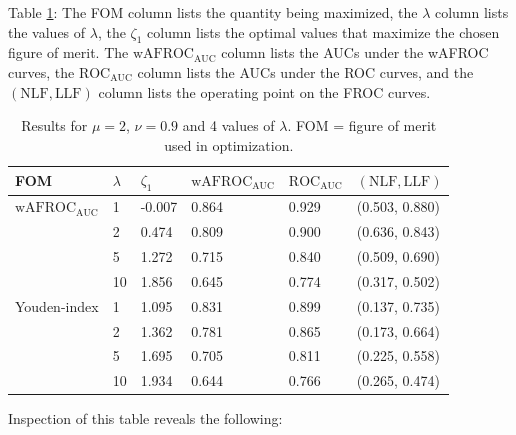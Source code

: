 \documentclass[
]{book}
\begin{document}
Table \ref{tab:optim-op-point-table-vary-lambda}: The FOM column lists the quantity being maximized, the \(\lambda\) column lists the values of \(\lambda\), the \(\zeta_1\) column lists the optimal values that maximize the chosen figure of merit. The \(\text{wAFROC}_\text{AUC}\) column lists the AUCs under the wAFROC curves, the \(\text{ROC}_\text{AUC}\) column lists the AUCs under the ROC curves, and the \(\left( \text{NLF}, \text{LLF}\right)\) column lists the operating point on the FROC curves.

\begin{table}

\caption{\label{tab:optim-op-point-table-vary-lambda}Results for $\mu = 2$, $\nu = 0.9$ and 4 values of $\lambda$. FOM = figure of merit used in optimization.}
\centering
\fontsize{10}{12}\selectfont
\begin{tabular}[t]{llllll}
\toprule
FOM & $\lambda$ & $\zeta_1$ & $\text{wAFROC}_\text{AUC}$ & $\text{ROC}_\text{AUC}$ & $\left( \text{NLF}, \text{LLF}\right)$\\
\midrule
$\text{wAFROC}_\text{AUC}$ & 1 & -0.007 & 0.864 & 0.929 & (0.503, 0.880)\\
 & 2 & 0.474 & 0.809 & 0.900 & (0.636, 0.843)\\
 & 5 & 1.272 & 0.715 & 0.840 & (0.509, 0.690)\\
 & 10 & 1.856 & 0.645 & 0.774 & (0.317, 0.502)\\
Youden-index & 1 & 1.095 & 0.831 & 0.899 & (0.137, 0.735)\\
\addlinespace
 & 2 & 1.362 & 0.781 & 0.865 & (0.173, 0.664)\\
 & 5 & 1.695 & 0.705 & 0.811 & (0.225, 0.558)\\
 & 10 & 1.934 & 0.644 & 0.766 & (0.265, 0.474)\\
\bottomrule
\end{tabular}
\end{table}

Inspection of this table reveals the following:
\end{document}
